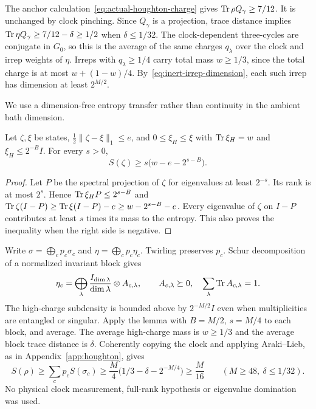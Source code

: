 The anchor calculation~\eqref{eq:actual-houghton-charge} gives
$\operatorname{Tr}\rho Q_\gamma\geq7/12$. It is unchanged by clock pinching.
Since $Q_\gamma$ is a projection, trace distance implies
$\operatorname{Tr}\eta Q_\gamma\geq7/12-\delta\geq1/2$ when $\delta\leq1/32$.
The clock-dependent three-cycles are conjugate in $G_0$, so this is
the average of the same charges $q_\lambda$ over the clock and
irrep weights of $\eta$. Irreps with $q_\lambda\geq1/4$ carry total
mass $w\geq1/3$, since the total charge is at most
$w+(1-w)/4$. By~\eqref{eq:inert-irrep-dimension}, each such irrep has
dimension at least $2^{M/2}$.

We use a dimension-free entropy transfer rather than continuity in
the ambient bath dimension.
\begin{lemma}
\label{lem:flat-subdensity-transfer}
Let $\zeta,\xi$ be states, $\frac12\|\zeta-\xi\|_1\leq e$, and
$0\leq\xi_H\leq\xi$ with $\operatorname{Tr}\xi_H=w$ and
$\xi_H\leq2^{-B}I$. For every $s>0$,
\[
 S(\zeta)\geq s\bigl(w-e-2^{s-B}\bigr).
\]
\end{lemma}
\begin{proof}
Let $P$ be the spectral projection of $\zeta$ for eigenvalues at
least $2^{-s}$. Its rank is at most $2^s$. Hence
$\operatorname{Tr}\xi_H P\leq2^{s-B}$ and
$\operatorname{Tr}\zeta(I-P)\geq\operatorname{Tr}\xi(I-P)-e
\geq w-2^{s-B}-e$. Every eigenvalue of $\zeta$ on $I-P$ contributes
at least $s$ times its mass to the entropy. This also proves the
inequality when the right side is negative.
\end{proof}

Write $\sigma=\bigoplus_cp_c\sigma_c$ and
$\eta=\bigoplus_cp_c\eta_c$. Twirling preserves $p_c$.
Schur decomposition of a normalized invariant block gives
\[
 \eta_c=\bigoplus_\lambda
       \frac{I_{\dim\lambda}}{\dim\lambda}\otimes A_{c,\lambda},
 \qquad A_{c,\lambda}\succeq0,\quad
       \sum_\lambda\operatorname{Tr} A_{c,\lambda}=1.
\]
The high-charge subdensity is bounded above by $2^{-M/2}I$ even
when multiplicities are entangled or singular. Apply the lemma with
$B=M/2$, $s=M/4$ to each block, and average. The average high-charge
mass is $w\geq1/3$ and the average block trace distance is $\delta$.
Coherently copying the clock and applying Araki--Lieb, as in
Appendix~\ref{app:houghton}, gives
\begin{equation}\label{eq:inert-entropy-floor}
 S(\rho)\geq\sum_cp_c S(\sigma_c)
 \geq\frac M4\bigl(1/3-\delta-2^{-M/4}\bigr)
 \geq\frac M{16}\qquad(M\geq48,\ \delta\leq1/32).
\end{equation}
No physical clock measurement, full-rank hypothesis or eigenvalue
domination was used.

